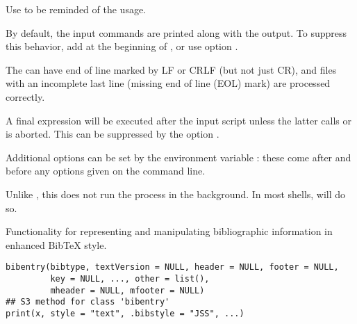 %
\begin{Details}\relax
Use  to be reminded of the usage.

By default, the input commands are printed along with the output.  To
suppress this behavior, add  at the
beginning of , or use option .

The  can have end of line marked by LF or CRLF (but not
just CR), and files with an incomplete last line (missing end of line
(EOL) mark) are processed correctly.

A final expression  will be executed after the input
script unless the latter calls  or is aborted.
This can be suppressed by the option .

Additional options can be set by the environment variable
: these come after
 and before any options given
on the command line.
\end{Details}
%
\begin{Note}\relax
Unlike , this does not run the \R{} process in the
background.  In most shells,
will do so.
\end{Note}
%
\begin{Description}\relax
Functionality for representing and manipulating bibliographic
information in enhanced BibTeX style.
\end{Description}
%
\begin{Usage}
\begin{verbatim}
bibentry(bibtype, textVersion = NULL, header = NULL, footer = NULL,
         key = NULL, ..., other = list(),
         mheader = NULL, mfooter = NULL)
## S3 method for class 'bibentry'
print(x, style = "text", .bibstyle = "JSS", ...)
\end{verbatim}
\end{Usage}
%
